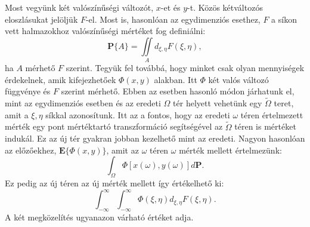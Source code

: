 \documentclass{article}
\begin{document}
Most vegyünk két valószínűségi változót, $x$-et és $y$-t. Közös kétváltozós eloszlásukat jelöljük $F$-el. Most is, hasonlóan az egydimenziós esethez, $F$ a síkon vett halmazokhoz valószínűségi mértéket fog definiálni:
\[
	\mathrm{\textbf{P}}\{ A \} = \iint\limits_{A} d_{\xi,\eta} F(\xi,\eta),
\]
ha $A$ mérhető $F$ szerint. Tegyük fel továbbá, hogy minket csak olyan mennyiségek érdekelnek, amik kifejezhetőek $\Phi(x,y)$ alakban. Itt $\Phi$ két valós változó függvénye és $F$ szerint mérhető. Ebben az esetben hasonló módon járhatunk el, mint az egydimenziós esetben és az eredeti $\Omega$ tér helyett vehetünk egy $\tilde{\Omega}$ teret, amit a $\xi,\eta$ síkkal azonosítunk. Itt az a fontos, hogy az eredeti $\omega$ téren értelmezett mérték egy pont mértéktartó transzformáció segítségével az $\tilde{\Omega}$ téren is mértéket indukál. Ez az új tér gyakran jobban kezelhető mint az eredeti. Nagyon hasonlóan az előzőekhez, $\mathrm{\textbf{E}}\{\Phi(x,y)\}$, amit az $\omega$ téren $\omega$ mérték mellett értelmezünk:
\[
	\int_{\Omega} \Phi\left[x(\omega),y(\omega)\right] d \mathrm{\textbf{P}}.
\]
Ez pedig az új téren az új mérték mellett így értékelhető ki:
\[
	\int_{-\infty}^{\infty} \int_{-\infty}^{\infty} \Phi(\xi,\eta) d_{\xi,\eta} F(\xi,\eta).
\]
A két megközelítés ugyanazon várható értéket adja.
\end{document}
